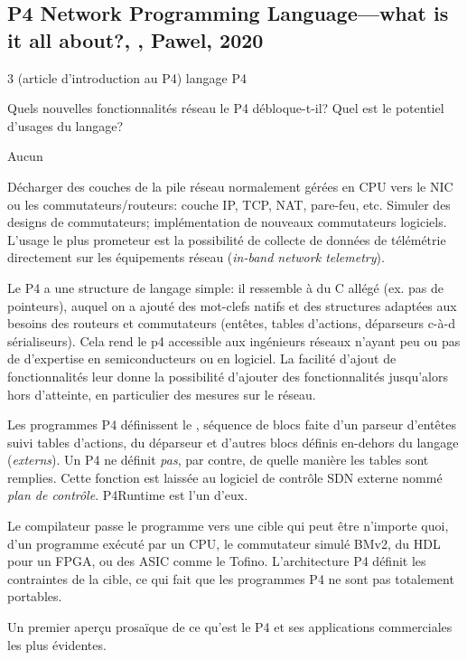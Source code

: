 
\subsection{P4 Network Programming Language—what is it all about?, \cite{parol_p4_2020}, Pawel, 2020}
 3 (article d'introduction au P4)
 langage P4

 Quels nouvelles fonctionnalités réseau le P4 débloque-t-il? Quel est le potentiel d'usages du langage?

 Aucun

 Décharger des couches de la pile réseau normalement gérées en CPU vers le NIC ou les commutateurs/routeurs: couche IP, TCP, NAT, pare-feu, etc. Simuler des designs de commutateurs; implémentation de nouveaux commutateurs logiciels. L'usage le plus prometeur est la possibilité de collecte de données de télémétrie directement sur les équipements réseau (\emph{in-band network telemetry}).

 Le P4 a une structure de langage simple: il ressemble à du C allégé (ex. pas de pointeurs), auquel on a ajouté des mot-clefs natifs et des structures adaptées aux besoins des routeurs et commutateurs (entêtes, tables d'actions, déparseurs c-à-d sérialiseurs). Cela rend le p4 accessible aux ingénieurs réseaux n'ayant peu ou pas de d'expertise en semiconducteurs ou en logiciel. La facilité d'ajout de fonctionnalités leur donne la possibilité d'ajouter des fonctionnalités jusqu'alors hors d'atteinte, en particulier des mesures sur le réseau.

Les programmes P4 définissent le , séquence de blocs faite d'un parseur d'entêtes suivi tables d'actions, du déparseur et d'autres blocs définis en-dehors du langage (\emph{externs}). Un P4 ne définit \emph{pas}, par contre, de quelle manière les tables sont remplies. Cette fonction est laissée au logiciel de contrôle SDN externe nommé \emph{plan de contrôle}. P4Runtime est l'un d'eux.

Le compilateur passe le programme vers une cible qui peut être n'importe quoi, d'un programme exécuté par un CPU, le commutateur simulé BMv2, du HDL pour un FPGA, ou des ASIC comme le Tofino. L'architecture P4 définit les contraintes de la cible, ce qui fait que les programmes P4 ne sont pas totalement portables.

 Un premier aperçu prosaïque de ce qu'est le P4 et ses applications commerciales les plus évidentes.

\clearpage
